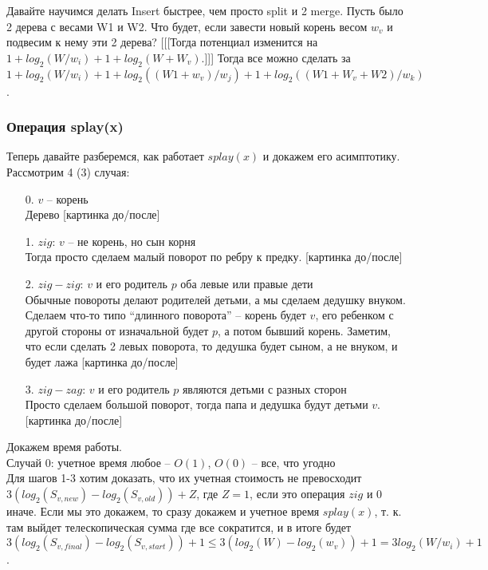 Давайте научимся делать Insert быстрее, чем просто split и 2 merge. Пусть было 2 дерева с весами W1 и W2. Что будет, если завести новый корень весом $w_v$ и подвесим к нему эти 2 дерева? [[[Тогда потенциал изменится на $1 + log_2(W/w_i) + 1 + log_2(W + W_v)$.]]] Тогда все можно сделать за $1 + log_2(W/w_i) + 1 + log_2((W1 + w_v)/w_j) + 1 + log_2((W1 + W_v + W2)/w_k)$.

\subsubsection{Операция splay(x)}

Теперь давайте разберемся, как работает $splay(x)$ и докажем его асимптотику. Рассмотрим 4 (3) случая:

\begin{enumerate}
    \item[0.] $v$ -- корень \\
        Дерево [картинка до/после]
    \item[1.] $zig$: $v$ -- не корень, но сын корня \\
        Тогда просто сделаем малый поворот по ребру к предку. [картинка до/после]
    \item[2.] $zig-zig$: $v$ и его родитель $p$ оба левые или правые дети \\
        Обычные повороты делают родителей детьми, а мы сделаем дедушку внуком. Сделаем что-то типо ``длинного поворота'' -- корень будет $v$, его ребенком с другой стороны от изначальной будет $p$, а потом бывший корень. Заметим, что если сделать 2 левых поворота, то дедушка будет сыном, а не внуком, и будет лажа [картинка до/после]
    \item[3.] $zig-zag$: $v$ и его родитель $p$ являются детьми с разных сторон \\
        Просто сделаем большой поворот, тогда папа и дедушка будут детьми $v$. [картинка до/после]
\end{enumerate}


Докажем время работы. \\
Случай 0: учетное время любое -- $O(1)$, $O(0)$ -- все, что угодно \\
Для шагов 1-3 хотим доказать, что их учетная стоимость не превосходит $3(log_2(S_{v, new}) - log_2(S_{v, old})) + Z$, где $Z = 1$, если это операция $zig$ и 0 иначе. Если мы это докажем, то сразу докажем и учетное время $splay(x)$, т. к. там выйдет телескопическая сумма где все сократится, и в итоге будет $3(log_2(S_{v, final}) - log_2(S_{v, start})) + 1 \leq 3(log_2(W) - log_2(w_v)) + 1 = 3log_2(W/w_i) + 1$.

